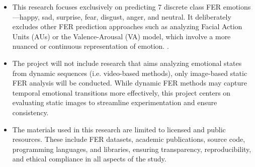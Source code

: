 \begin{itemize}
\item This research focuses exclusively on predicting 7 discrete class FER emotions —happy, sad, surprise, fear, disgust, anger, and neutral. It deliberately excludes other FER prediction approaches such as analyzing Facial Action Units (AUs) or the Valence-Arousal (VA) model, which involve a more nuanced or continuous representation of emotion. \cite{mollahosseini_affectnet_2019}\cite{kollias_affect_2021}.

\item The project will not include research that aims analyzing emotional states from dynamic sequences (i.e. video-based methods)\cite{wang_survey_2024}, only image-based static FER analysis will be conducted. While dynamic FER methods may capture temporal emotional transitions more effectively, this project centers on evaluating static images to streamline experimentation and ensure consistency.

\item The materials used in this research are limited to licensed and public resources. These include FER datasets, academic publications, source code, programming languages, and libraries, ensuring transparency, reproducibility, and ethical compliance in all aspects of the study.
\end{itemize}

